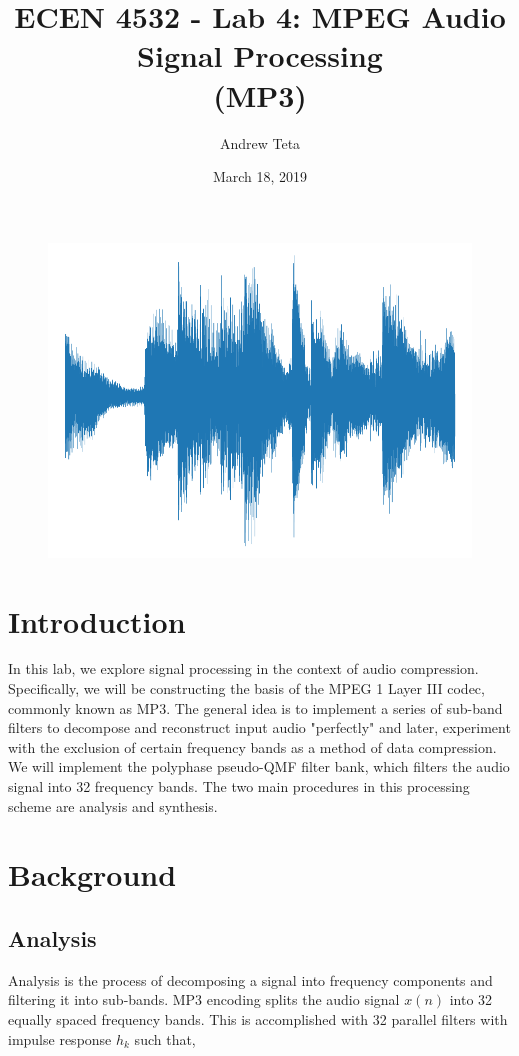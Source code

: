 \documentclass[11pt,a4paper]{article}
\author{Andrew Teta}
\title{ECEN 4532 - Lab 4: MPEG Audio Signal Processing \\ (MP3)}
\date{March 18, 2019}
\begin{document}
\maketitle

\begin{figure}[ht]
	\centering
	\includegraphics[width=\textwidth]{titlepic}
\end{figure}

\pagebreak

\tableofcontents

\pagebreak

\section{Introduction}
In this lab, we explore signal processing in the context of audio compression. Specifically, we will be constructing the basis of the MPEG 1 Layer III codec, commonly known as MP3. The general idea is to implement a series of sub-band filters to decompose and reconstruct input audio "perfectly" and later, experiment with the exclusion of certain frequency bands as a method of data compression. We will implement the polyphase pseudo-QMF filter bank, which filters the audio signal into 32 frequency bands. The two main procedures in this processing scheme are analysis and synthesis.

\section{Background}
\subsection{Analysis}
Analysis is the process of decomposing a signal into frequency components and filtering it into sub-bands. MP3 encoding splits the audio signal $x(n)$ into 32 equally spaced frequency bands. This is accomplished with 32 parallel filters with impulse response $h_k$ such that,
\end{document}
